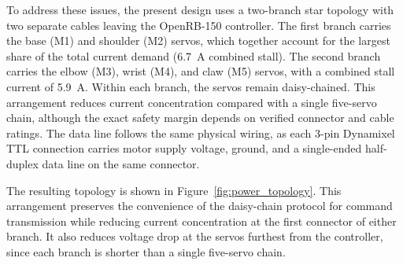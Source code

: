 To address these issues, the present design uses a two-branch star 
topology with two separate cables leaving the OpenRB-150 controller. 
The first branch carries the base (M1) and shoulder (M2) servos, 
which together account for the largest share of the total current 
demand (6.7~A combined stall). The second branch carries the elbow 
(M3), wrist (M4), and claw (M5) servos, with a combined stall 
current of 5.9~A. Within each branch, the servos remain 
daisy-chained. This arrangement reduces current concentration 
compared with a single five-servo chain, although the exact safety 
margin depends on verified connector and cable ratings. The data line 
follows the same physical wiring, as each 3-pin Dynamixel TTL 
connection carries motor supply voltage, ground, and a single-ended 
half-duplex data line on the same connector.

The resulting topology is shown in 
Figure~\ref{fig:power_topology}. This arrangement preserves the 
convenience of the daisy-chain protocol for command transmission 
while reducing current concentration at the first connector of either 
branch. It also reduces voltage drop at the servos furthest from 
the controller, since each branch is shorter than a single 
five-servo chain.

